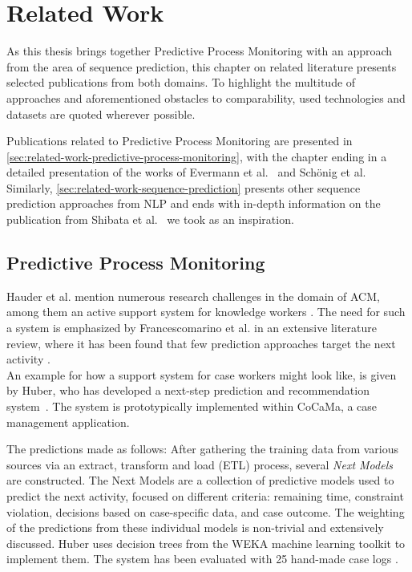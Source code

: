 \chapter{Related Work}\label{chap:related-work}
As this thesis brings together Predictive Process Monitoring with an approach from the area of sequence prediction, this chapter on related literature presents selected publications from both domains. To highlight the multitude of approaches and aforementioned obstacles to comparability, used technologies and datasets are quoted wherever possible.

Publications related to Predictive Process Monitoring are presented in \autoref{sec:related-work-predictive-process-monitoring}, with the chapter ending in a detailed presentation of the works of Evermann et al.~\cite{evermann2016} and Schönig et al.~\cite{schoenig2018} Similarly, \autoref{sec:related-work-sequence-prediction} presents other sequence prediction approaches from NLP and ends with in-depth information on the publication from Shibata et al.~\cite{shibata2016bipartite} we took as an inspiration.

\section{Predictive Process Monitoring}
\label{sec:related-work-predictive-process-monitoring}
Hauder et al. mention numerous research challenges in the domain of ACM, among them an active support system for knowledge workers \cite{hauder2014}.
The need for such a system is emphasized by Francescomarino et al. in an extensive literature review, where it has been found that few prediction approaches target the next activity \cite{francescomarino2018}.\\

An example for how a support system \cite{hauder2014} for case workers might look like, is given by Huber, who has developed a next-step prediction and recommendation system~\cite{huber2015}. The system is prototypically implemented within CoCaMa, a case management application.

The predictions made as follows: After gathering the training data from various sources via an extract, transform and load (ETL) process, several \textit{Next Models} are constructed. The Next Models are a collection of predictive models used to predict the next activity, focused on different criteria: remaining time, constraint violation, decisions based on case-specific data, and case outcome. The weighting of the predictions from these individual models is non-trivial and extensively discussed. Huber uses decision trees from the WEKA \cite{web:weka} machine learning toolkit to implement them. The system has been evaluated with 25 hand-made case logs \cite{huber2015}.\\

